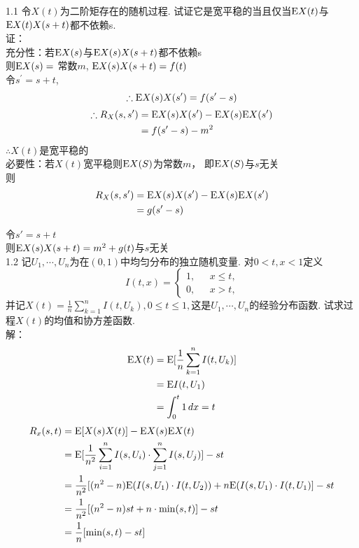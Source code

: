 

1.1 令$X(t)$为二阶矩存在的随机过程. 试证它是宽平稳的当且仅当$\mathrm{E} X(t)$与$\mathrm{E} X(t)X(s+t)$都不依赖s.\\
证：\\
充分性：若$\mathrm{E} X(s)$与$\mathrm{E} X(s)X(s+t)$都不依赖s\\
        则$\mathrm{E} X(s) = $ 常数$m$, $\mathrm{E} X(s)X(s+t) = f(t)$\\
        令$s^{\prime} = s + t$,\\
        \[
        \therefore \mathrm{E} X(s)X(s^{\prime}) = f(s^{\prime}-s)
        \]
		\[
			\begin{aligned}
			\therefore R_X(s, s^{\prime})  & = \mathrm{E} X(s)X(s^{\prime}) - \mathrm{E} X(s)\mathrm{E} X(s^{\prime}) \\
									 & = f(s^{\prime} - s) - m^2
			\end{aligned}
		\]
		$\therefore X(t)$是宽平稳的\\
必要性：若$X(t)$宽平稳则$\mathrm{E} X(S)$为常数$m$， 即$\mathrm{E} X(S)$与$s$无关\\
				则
			\[
			\begin{aligned}
			 R_X(s, s^{\prime}) & = \mathrm{E} X(s)X(s^{\prime}) - \mathrm{E} X(s)\mathrm{E} X(s^{\prime}) \\
									& = g(s^{\prime} - s) \\
			\end{aligned}
			\]

			令$s' = s + t$ \\
			则$\mathrm{E} X(s)X(s+t) = m^2 + g(t)$与$s$无关\\


1.2 记$U_1, \cdots, U_n$为在$(0,1)$中均匀分布的独立随机变量. 对$0<t,x<1$定义
	\[ I(t,x) =
		\begin{cases}
		1, & \text{ $x \leqslant t$,} \\
		0, & \text{ $x > t$,}
		\end{cases}
	\]
并记$X(t) = \frac{1}{n}\sum\limits^n_{k=1}I(t,U_k), 0 \leqslant t \leqslant 1, $这是$U_1, \cdots, U_n$的经验分布函数. 试求过程$X(t)$的均值和协方差函数.\\
解：
	\[
	\begin{aligned}
	\mathrm{E} X(t) & = \mathrm{E} [\frac{1}{n}\sum^n_{k=1}I(t, U_k)] \\
		& = \mathrm{E} I(t, U_1) \\
		& = \int^t_0 1\,dx = t \\
	\end{aligned}
	\]
	\[
	\begin{aligned}
	R_x(s, t) & = \mathrm{E} [X(s)X(t)] - \mathrm{E} X(s)\mathrm{E} X(t)\\
			& = \mathrm{E} [\frac{1}{n^2}\sum^n_{i=1}I(s, U_i) \cdot \sum^n_{j=1}I(s, U_j)] - st\\
			& = \frac{1}{n^2}[(n^2 - n)\mathrm{E} (I(s, U_1) \cdot I(t, U_2)) + n\mathrm{E} (I(s, U_1) \cdot I(t, U_1)] - st\\
			& = \frac{1}{n^2}[(n^2 - n)st + n \cdot \min(s, t)] - st\\
			& = \frac{1}{n}[\min(s, t) - st]
	\end{aligned}
	\]\\


